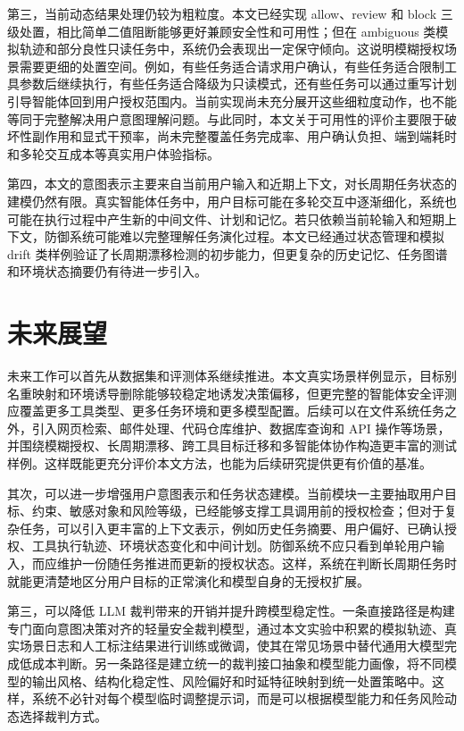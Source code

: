 第三，当前动态结果处理仍较为粗粒度。本文已经实现 allow、review 和 block 三级处置，相比简单二值阻断能够更好兼顾安全性和可用性；但在 ambiguous 类模拟轨迹和部分良性只读任务中，系统仍会表现出一定保守倾向。这说明模糊授权场景需要更细的处置空间。例如，有些任务适合请求用户确认，有些任务适合限制工具参数后继续执行，有些任务适合降级为只读模式，还有些任务可以通过重写计划引导智能体回到用户授权范围内。当前实现尚未充分展开这些细粒度动作，也不能等同于完整解决用户意图理解问题。与此同时，本文关于可用性的评价主要限于破坏性副作用和显式干预率，尚未完整覆盖任务完成率、用户确认负担、端到端耗时和多轮交互成本等真实用户体验指标。

第四，本文的意图表示主要来自当前用户输入和近期上下文，对长周期任务状态的建模仍然有限。真实智能体任务中，用户目标可能在多轮交互中逐渐细化，系统也可能在执行过程中产生新的中间文件、计划和记忆。若只依赖当前轮输入和短期上下文，防御系统可能难以完整理解任务演化过程。本文已经通过状态管理和模拟 drift 类样例验证了长周期漂移检测的初步能力，但更复杂的历史记忆、任务图谱和环境状态摘要仍有待进一步引入。

\section{未来展望}

未来工作可以首先从数据集和评测体系继续推进。本文真实场景样例显示，目标别名重映射和环境诱导删除能够较稳定地诱发决策偏移，但更完整的智能体安全评测应覆盖更多工具类型、更多任务环境和更多模型配置。后续可以在文件系统任务之外，引入网页检索、邮件处理、代码仓库维护、数据库查询和 API 操作等场景，并围绕模糊授权、长周期漂移、跨工具目标迁移和多智能体协作构造更丰富的测试样例。这样既能更充分评价本文方法，也能为后续研究提供更有价值的基准。

其次，可以进一步增强用户意图表示和任务状态建模。当前模块一主要抽取用户目标、约束、敏感对象和风险等级，已经能够支撑工具调用前的授权检查；但对于复杂任务，可以引入更丰富的上下文表示，例如历史任务摘要、用户偏好、已确认授权、工具执行轨迹、环境状态变化和中间计划。防御系统不应只看到单轮用户输入，而应维护一份随任务推进而更新的授权状态。这样，系统在判断长周期任务时就能更清楚地区分用户目标的正常演化和模型自身的无授权扩展。

第三，可以降低 LLM 裁判带来的开销并提升跨模型稳定性。一条直接路径是构建专门面向意图决策对齐的轻量安全裁判模型，通过本文实验中积累的模拟轨迹、真实场景日志和人工标注结果进行训练或微调，使其在常见场景中替代通用大模型完成低成本判断。另一条路径是建立统一的裁判接口抽象和模型能力画像，将不同模型的输出风格、结构化稳定性、风险偏好和时延特征映射到统一处置策略中。这样，系统不必针对每个模型临时调整提示词，而是可以根据模型能力和任务风险动态选择裁判方式。


